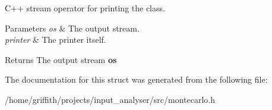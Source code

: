 C++ stream operator for printing the class. 
\begin{DoxyParams}{Parameters}
{\em os} & The output stream. \\
\hline
{\em printer} & The printer itself. \\
\hline
\end{DoxyParams}
\begin{DoxyReturn}{Returns}
The output stream {\bfseries os} 
\end{DoxyReturn}


The documentation for this struct was generated from the following file\+:\begin{DoxyCompactItemize}
\item 
/home/griffith/projects/input\+\_\+analyser/src/montecarlo.\+h\end{DoxyCompactItemize}
